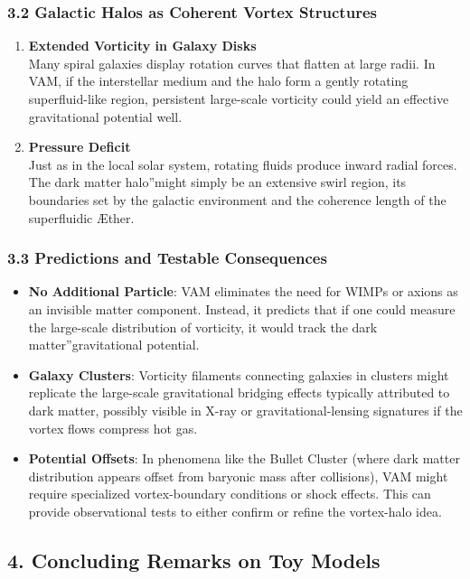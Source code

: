 \documentclass[a4paper,12pt]{article}
\begin{document}
\subsubsection*{3.2 Galactic Halos as Coherent Vortex Structures}
\begin{enumerate}
    \item \textbf{Extended Vorticity in Galaxy Disks} \\
    Many spiral galaxies display rotation curves that flatten at large radii. In VAM, if the interstellar medium and the halo form a gently rotating superfluid-like region, persistent large-scale vorticity could yield an effective gravitational potential well.
    \item \textbf{Pressure Deficit} \\
    Just as in the local solar system, rotating fluids produce inward radial forces. The \grqq dark matter halo\textquotedblright might simply be an extensive swirl region, its boundaries set by the galactic environment and the coherence length of the superfluidic Æther.
\end{enumerate}

\subsubsection*{3.3 Predictions and Testable Consequences}
\begin{itemize}
    \item \textbf{No Additional Particle}: VAM eliminates the need for WIMPs or axions as an invisible matter component. Instead, it predicts that if one could measure the large-scale distribution of vorticity, it would track the \grqq dark matter\textquotedblright gravitational potential.
    \item \textbf{Galaxy Clusters}: Vorticity filaments connecting galaxies in clusters might replicate the large-scale gravitational bridging effects typically attributed to dark matter, possibly visible in X-ray or gravitational-lensing signatures if the vortex flows compress hot gas.
    \item \textbf{Potential Offsets}: In phenomena like the Bullet Cluster (where dark matter distribution appears offset from baryonic mass after collisions), VAM might require specialized vortex-boundary conditions or shock effects. This can provide observational tests to either confirm or refine the vortex-halo idea.
\end{itemize}

\subsection*{4. Concluding Remarks on Toy Models}
\end{document}
